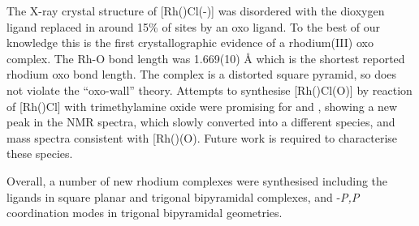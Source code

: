 The X-ray crystal structure of [Rh(\tBuxantphos)Cl(-)] was disordered with the dioxygen ligand replaced in around 15\% of sites by an oxo ligand.  To the best of our knowledge this is the first crystallographic evidence of a rhodium(III) oxo complex.  The Rh-O bond length was 1.669(10) \si{\angstrom} which is the shortest reported rhodium oxo bond length.  The complex is a distorted square pyramid, so does not violate the ``oxo-wall'' theory.  Attempts to synthesise [Rh(\tBuxantphosk)Cl(O)] by reaction of [Rh(\tBuxantphosk)Cl] with trimethylamine oxide were promising for \tButhixantphos{} and \tBuxantphos{}, showing a new peak in the \phosphorus{} NMR spectra, which slowly converted into a different species, and mass spectra consistent with [Rh(\tBuxantphosk)(O)\ce{]+}.  Future work is required to characterise these species.  

Overall, a number of new rhodium complexes were synthesised including the \tBuxantphos{} ligands in \POP{} square planar and trigonal bipyramidal complexes, and \dento{}-\emph{P,P}\textprime{} coordination modes in trigonal bipyramidal geometries.  

















